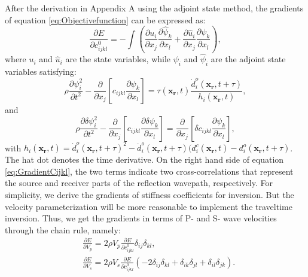 After the derivation in Appendix A using the adjoint state method, the gradients of equation \eqref{eq:Objectivefunction} can be expressed as:
\begin{equation}
	\frac{\partial E}{\partial c^0_{ijkl}}=-\int (\frac{\partial u_{i}}{\partial
	x_j}\frac{\partial \hat{\psi}_{k}}{\partial x_l}+\frac{\partial \hat{u}_{i}}{\partial
	x_j}\frac{\partial \psi_{k}}{\partial x_l}),
    \label{eq:GradientCijkl}
\end{equation}
where $u_i$ and $\hat{u}_i$ are the state variables, while $\psi_i$ and $\hat{
\psi}_i$ are the adjoint state variables satisfying:
\begin{equation}
    \rho \frac{\partial \psi^2_i}{\partial t^2}  -
    \frac{\partial}{\partial x_j}\left[ 
        c_{ijkl}\frac{\partial \psi_{k}}{\partial
		x_l}\right]=\tau(\mathbf{x_r},t)\frac{\dot{d}^o_i(\mathbf{x_r},t+\tau)}{h_i(\mathbf{x_r},t)},
    \label{eq:AdjointWE} 
\end{equation}
and
\begin{equation}
    \rho \frac{\partial \delta \psi^2_i}{\partial t^2}  -
    \frac{\partial}{\partial x_j}\left[ 
        c_{ijkl}\frac{\partial \delta \psi_{k}}{\partial
        x_l}\right]=\frac{\partial}{\partial x_j}\left[\delta c_{ijkl}\frac{\partial
		\psi_{k}}{\partial x_l}\right],
    \label{eq:AdjointDeltaWE} 
\end{equation}
with
$h_i(\mathbf{x_r},t)=\dot{d}^o_i(\mathbf{x_r},t+\tau)^2-\ddot{d}^o_i(\mathbf{x_r},t+\tau)(d^c_i(\mathbf{x_r},t)-d^o_i(\mathbf{x_r},t+\tau)$.
The hat dot denotes the time derivative. On the right hand side of equation
\eqref{eq:GradientCijkl}, the two terms indicate two cross-correlations that represent the source and receiver
parts of the reflection wavepath, respectively. For simplicity, we derive the
gradients of stiffness
coefficients for inversion. But the velocity parameterization will be more reasonable
to implement the traveltime inversion.
Thus, we get the gradients in terms of P- and S- wave velocities through the chain rule, namely:
\begin{equation}
	\begin{split}
	&\frac{\partial E}{\partial V_p}=2\rho V_p\frac{\partial E}{\partial
		c^0_{ijkl}}\delta_{ij}\delta_{kl}, \\
	&\frac{\partial E}{\partial V_s}=2\rho V_s\frac{\partial
	E}{\partial c^0_{ijkl}}(-2\delta_{ij}\delta_{kl}+\delta_{ik}\delta_{jl}+
	\delta_{il}\delta_{jk}).
	\end{split}
    \label{eq:GradientVel}
\end{equation}

